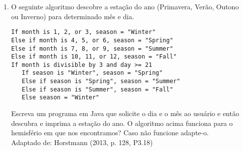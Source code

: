 \documentclass[onecolumn,a4paper,10pt]{report}
\newcommand{\+}{\, + \,}
\newcommand{\<}{\hspace*{-0.4cm}}
\begin{document}
\begin{enumerate}[1.]
\item O seguinte algoritmo descobre a estação do ano (Primavera, Verão, Outono ou Inverno) para determinado mês e dia.
\begin{verbatim}
If month is 1, 2, or 3, season = "Winter"
Else if month is 4, 5, or 6, season = "Spring"
Else if month is 7, 8, or 9, season = "Summer"
Else if month is 10, 11, or 12, season = "Fall"
If month is divisible by 3 and day >= 21
   If season is "Winter", season = "Spring"
   Else if season is "Spring", season = "Summer"
   Else if season is "Summer", season = "Fall"
   Else season = "Winter"
\end{verbatim}
Escreva um programa em Java que solicite o dia e o mês
ao usuário e então descubra e imprima a estação do ano.
O algoritmo acima funciona para o hemisfério em que nos encontramos? Caso não funcione adapte-o.\\
{\tiny Adaptado de: Horstmann (2013, p. 128, P3.18)}

\end{enumerate}


\begin{comment}
\noindent{FORBELLONE, André Luiz Villar; EBERSPÄCHER, Henri Frederico. \textbf{Lógica de programação}: a construção de algoritmos e estruturas de dados. 3. ed. São Paulo: Prentice Hall, 2005. 218 p.}
\end{comment}


\end{document}
